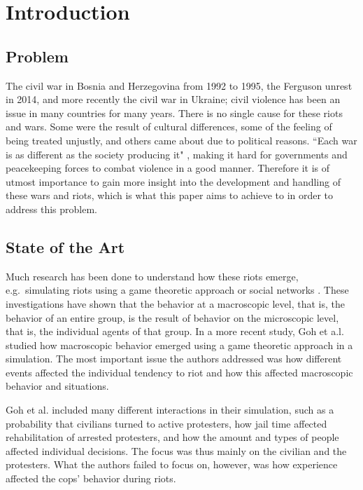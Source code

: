\section{Introduction}
\subsection{Problem}
The civil war in Bosnia and Herzegovina from 1992 to 1995, the Ferguson unrest in 2014, and more recently the civil war in Ukraine; civil violence has been an issue in many countries for many years.
There is no single cause for these riots and wars.
Some were the result of cultural differences, some of the feeling of being treated unjustly, and others came about due to political reasons.
``Each war is as different as the society producing it" \citep*{sambanis2001ethnic}, making it hard for governments and peacekeeping forces to combat violence in a good manner. Therefore it is of utmost importance to gain more insight into the development and handling of these wars and riots, which is what this paper aims to achieve to in order to address this problem.

\subsection{State of the Art}
Much research has been done to understand how these riots emerge, e.g.\ simulating riots using a game theoretic approach \citep*{myerson1991game} or social networks \citep*{gulden2002spatial}.
These investigations have shown that the behavior at a macroscopic level, that is, the behavior of an entire group, is the result of behavior on the microscopic level, that is, the individual agents of that group.
In a more recent study, Goh et a.l.\citep*{goh2006modeling} studied how macroscopic behavior emerged using a game theoretic approach in a simulation.
The most important issue the authors addressed was how different events affected the individual tendency to riot and how this affected macroscopic behavior and situations.


Goh et al. included many different interactions in their simulation, such as a probability that civilians turned to active protesters, how jail time affected rehabilitation of arrested protesters, and how the amount and types of people affected individual decisions. The focus was thus mainly on the civilian and the protesters. What the authors failed to focus on, however, was how experience affected the cops' behavior during riots.

